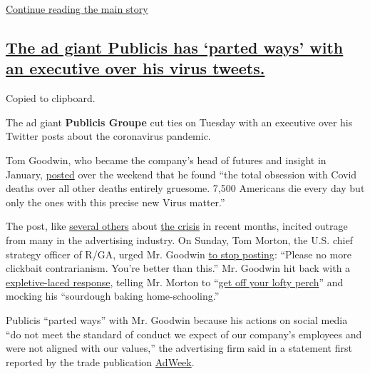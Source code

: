 \protect\hyperlink{after-dfp-ad-mid1}{Continue reading the main story}

\hypertarget{the-ad-giant-publicis-has-parted-ways-with-an-executive-over-his-virus-tweets}{%
\subsection{\texorpdfstring{\protect\hyperlink{the-ad-giant-publicis-has-parted-ways-with-an-executive-over-his-virus-tweets}{The
ad giant Publicis has `parted ways' with an executive over his virus
tweets.}}{The ad giant Publicis has `parted ways' with an executive over his virus tweets.}}\label{the-ad-giant-publicis-has-parted-ways-with-an-executive-over-his-virus-tweets}}

Copied to clipboard.

The ad giant \textbf{Publicis Groupe} cut ties on Tuesday with an
executive over his Twitter posts about the coronavirus pandemic.

Tom Goodwin, who became the company's head of futures and insight in
January,
\href{https://twitter.com/tomfgoodwin/status/1289981216335073280?s=20}{posted}
over the weekend that he found ``the total obsession with Covid deaths
over all other deaths entirely gruesome. 7,500 Americans die every day
but only the ones with this precise new Virus matter.''

The post, like
\href{https://twitter.com/tomfgoodwin/status/1251848439035502592?s=20}{several
others} about
\href{https://twitter.com/tomfgoodwin/status/1236483014277894144?s=20}{the
crisis} in recent months, incited outrage from many in the advertising
industry. On Sunday, Tom Morton, the U.S. chief strategy officer of
R/GA, urged Mr. Goodwin
\href{https://twitter.com/tommorton/status/1289992807038332928?s=20}{to
stop posting}: ``Please no more clickbait contrarianism. You're better
than this.'' Mr. Goodwin hit back with a
\href{https://twitter.com/tomfgoodwin/status/1289995369313497090?s=20}{expletive-laced
response}, telling Mr. Morton to
``\href{https://twitter.com/tomfgoodwin/status/1289994688275988481?s=20}{get
off your lofty perch}'' and mocking his ``sourdough baking
home-schooling.''

Publicis ``parted ways'' with Mr. Goodwin because his actions on social
media ``do not meet the standard of conduct we expect of our company's
employees and were not aligned with our values,'' the advertising firm
said in a statement first reported by the trade publication
\href{https://www.adweek.com/agencies/after-coronavirus-tweets-tom-goodwin-is-out-at-publicis-groupe/}{AdWeek}.

